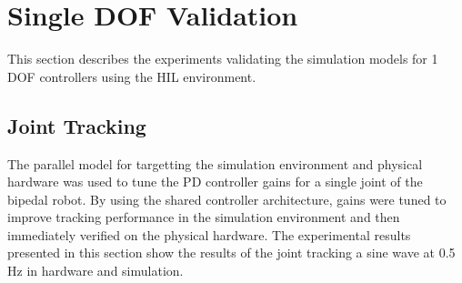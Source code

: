 

\section{Single DOF Validation} %
\label{sec:1dof_validation}
This section describes the experiments validating the simulation models for 1 DOF controllers using the HIL environment. 

\subsection{Joint Tracking} %
\label{sub:joint_tracking}
The parallel model for targetting the simulation environment and physical hardware was used to tune the PD controller gains for a single joint of the bipedal robot. By using the shared controller architecture, gains were tuned to improve tracking performance in the simulation environment and then immediately verified on the physical hardware. The experimental results presented in this section show the results of the joint tracking a sine wave at 0.5 Hz in hardware and simulation. 


